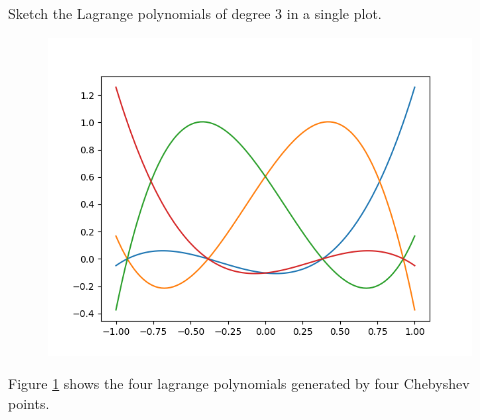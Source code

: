 \begin{problem}
Sketch the Lagrange polynomials of degree 3 in a single plot.
\end{problem}


\begin{solution}  
\begin{figure}[!ht]
  \centering
  \includegraphics[scale = 0.5]{./code/task_3.png}
  \label{fig:task_3}
\end{figure}

Figure \ref{fig:task_3} shows the four lagrange polynomials generated
by four Chebyshev points. 
\end{solution}

